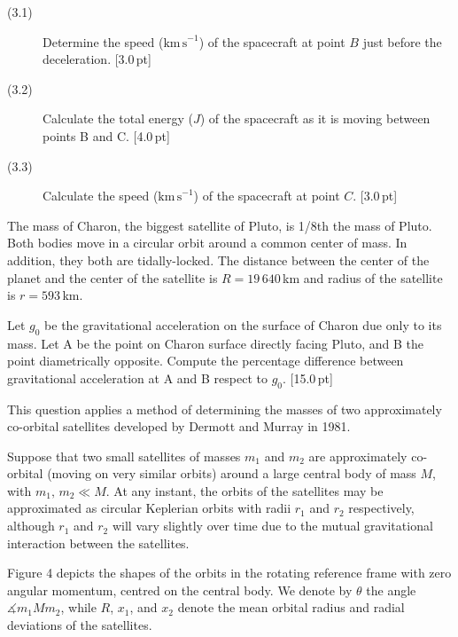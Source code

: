 
\begin{description}
\item[(3.1)] Determine the speed ($\mathrm{km\,s}^{-1}$) of the spacecraft at
  point $B$ just before the deceleration. \hfill[3.0\,pt]
\item[(3.2)] Calculate the total energy ($J$) of the spacecraft as it is
  moving between points B and C. \hfill[4.0\,pt]
\item[(3.3)] Calculate the speed ($\mathrm{km\,s}^{-1}$) of the spacecraft at
  point $C$. \hfill[3.0\,pt]
\end{description}

The mass of Charon, the biggest satellite of Pluto, is 1/8th the mass of
Pluto. Both bodies move in a circular orbit around a common center of mass. In
addition, they both are tidally-locked. The distance between the center of the
planet and the center of the satellite is $R = 19\,640$\,km and radius of the
satellite is $r = 593$\,km.

Let $g_0$ be the gravitational acceleration on the surface of Charon due only
to its mass. Let A be the point on Charon surface directly facing Pluto, and B
the point diametrically opposite. Compute the percentage difference between
gravitational acceleration at A and B respect to $g_0$. \hfill[15.0\,pt]

This question applies a method of determining the masses of two approximately
co-orbital satellites developed by Dermott and Murray in 1981.

Suppose that two small satellites of masses $m_1$ and $m_2$ are approximately
co-orbital (moving on very similar orbits) around a large central body of mass
$M$, with $m_1,\,m_2 \ll M$. At any instant, the orbits of the satellites may
be approximated as circular Keplerian orbits with radii $r_1$ and $r_2$
respectively, although $r_1$ and $r_2$ will vary slightly over time due to the
mutual gravitational interaction between the satellites.

Figure 4 depicts the shapes of the orbits in the rotating reference frame with
zero angular momentum, centred on the central body. We denote by $\theta$ the
angle $\measuredangle m_1 M m_2$, while $R$, $x_1$, and $x_2$ denote the mean
orbital radius and radial deviations of the satellites.

